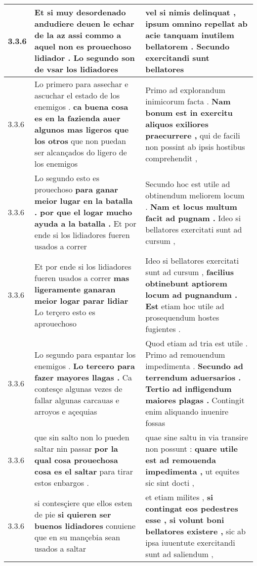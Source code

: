\begin{tabular}{|p{1cm}|p{6.5cm}|p{6.5cm}|}
3.3.6 & Et si muy desordenado andudiere deuen le echar de la az \textbf{ assi commo a aquel non es prouechoso lidiador . } Lo segundo son de vsar los lidiadores & vel si nimis delinquat , \textbf{ ipsum omnino repellat ab acie tanquam inutilem bellatorem . } Secundo exercitandi sunt bellatores \\\hline
3.3.6 & Lo primero para assechar e ascuchar el estado de los enemigos . \textbf{ ca buena cosa es en la fazienda auer algunos mas ligeros que los otros } que non puedan ser alcançados do ligero de los enemigos & Primo ad explorandum inimicorum facta . \textbf{ Nam bonum est in exercitu aliquos exiliores praecurrere , } qui de facili non possint ab ipsis hostibus comprehendit , \\\hline
3.3.6 & Lo segundo esto es prouechoso \textbf{ para ganar meior lugar en la batalla . por que el logar mucho ayuda a la batalla . } Et por ende si los lidiadores fueren usados a correr & Secundo hoc est utile ad obtinendum meliorem locum . \textbf{ Nam et locus multum facit ad pugnam . } Ideo si bellatores exercitati sunt ad cursum , \\\hline
3.3.6 & Et por ende si los lidiadores fueren usados a correr \textbf{ mas ligeramente ganaran meior logar parar lidiar } Lo terçero esto es aprouechoso & Ideo si bellatores exercitati sunt ad cursum , \textbf{ facilius obtinebunt aptiorem locum ad pugnandum . Est } etiam hoc utile ad prosequendum hostes fugientes . \\\hline
3.3.6 & Lo segundo para espantar los enemigos . \textbf{ Lo tercero para fazer mayores llagas . } Ca contesçe algunas vezes de fallar algunas carcauas e arroyos e açequias & Quod etiam ad tria est utile . Primo ad remouendum impedimenta . \textbf{ Secundo ad terrendum aduersarios . Tertio ad infligendum maiores plagas . } Contingit enim aliquando inuenire fossas \\\hline
3.3.6 & que sin salto non lo pueden saltar nin passar \textbf{ por la qual cosa prouechosa cosa es el saltar } para tirar estos enbargos . & quae sine saltu in via transire non possunt : \textbf{ quare utile est ad remouenda impedimenta , } ut equites sic sint docti , \\\hline
3.3.6 & si contesçiere que ellos esten de pie \textbf{ si quieren ser buenos lidiadores } conuiene que en su mançebia sean usados a saltar & et etiam milites , \textbf{ si contingat eos pedestres esse , si volunt boni bellatores existere , } sic ab ipsa iuuentute exercitandi sunt ad saliendum , \\\hline

\end{tabular}
